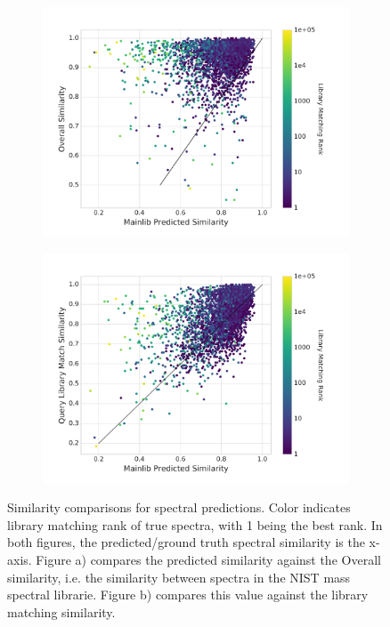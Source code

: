 \begin{figure}[h]
    \centering
    \begin{subfigure}[b]{0.48\linewidth}
        \includegraphics[width=\linewidth]{./figures/Similarity_plot_overall.png}
        \caption{}
    \end{subfigure}
    \begin{subfigure}[b]{0.48\linewidth}
        \includegraphics[width=\linewidth]{./figures/similarity_plot_library_match.png}
        \caption{}
    \end{subfigure}
    \caption[Similarity Measurements for Spectral Predictions]{Similarity comparisons for spectral predictions. Color indicates library matching rank of true spectra, with 1 being the best rank. In both figures, the predicted/ground truth spectral similarity is the x-axis. Figure a) compares the predicted similarity against the Overall similarity, i.e. the similarity between spectra in the NIST mass spectral librarie. Figure b) compares this value against the library matching similarity.}
    \label{fig:similarity_scatter_plots}
\end{figure}